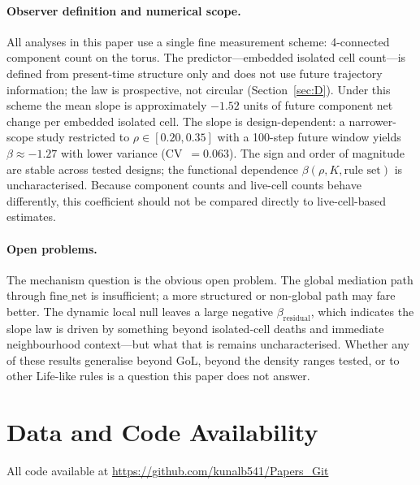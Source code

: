 \documentclass[11pt,a4paper]{article}
\newcommand{\fnet}{\mathrm{fine\_net}}
\newcommand{\bres}{\beta_{\mathrm{residual}}}
\begin{document}
\paragraph{Observer definition and numerical scope.}
All analyses in this paper use a single fine measurement scheme:
4-connected component count on the torus.
The predictor---embedded isolated cell count---is defined from present-time
structure only and does not use future trajectory information; the law is
prospective, not circular (Section~\ref{sec:D}).
Under this scheme the mean slope is approximately $-1.52$ units of future
component net change per embedded isolated cell.
The slope is design-dependent: a narrower-scope study restricted to
$\rho\in[0.20,0.35]$ with a 100-step future window yields
$\beta\approx-1.27$ with lower variance (CV~$=0.063$).
The sign and order of magnitude are stable across tested designs; the
functional dependence $\beta(\rho,K,\text{rule set})$ is uncharacterised.
Because component counts and live-cell counts behave differently, this
coefficient should not be compared directly to live-cell-based estimates.

\paragraph{Open problems.}
The mechanism question is the obvious open problem.
The global mediation path through $\fnet$ is insufficient; a more structured
or non-global path may fare better.
The dynamic local null leaves a large negative $\bres$, which indicates the
slope law is driven by something beyond isolated-cell deaths and immediate
neighbourhood context---but what that is remains uncharacterised.
Whether any of these results generalise beyond GoL, beyond the density ranges
tested, or to other Life-like rules is a question this paper does not answer.

\section*{Data and Code Availability}

All code available at \url{https://github.com/kunalb541/Papers_Git}
\end{document}
